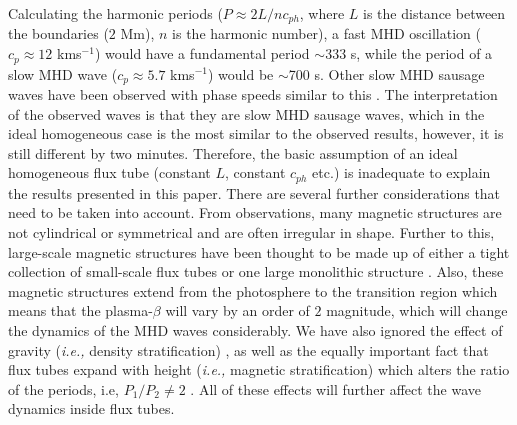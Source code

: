     Calculating the harmonic periods ($P \approx 2L/nc_{ph}$, where $L$ is the distance between the boundaries ($2$ Mm), $n$ is the harmonic number), a fast MHD oscillation ($c_{p}\approx12$ kms$^{-1}$) would have a fundamental period $\sim$333 s, while the period of a slow MHD wave ($c_{p}\approx5.7$ kms$^{-1}$) would be $\sim$700 s.
   	Other slow MHD sausage waves have been observed with phase speeds similar to this \citep{2015A&A...579A..73M}.
    The interpretation of the observed waves is that they are slow MHD sausage waves, which in the ideal homogeneous case is the most similar to the observed results, however, it is still different by two minutes.
    Therefore, the basic assumption of an ideal homogeneous flux tube (constant $L$, constant $c_{ph}$ etc.) is inadequate to explain the results presented in this paper.
    There are several further considerations that need to be taken into account.
    From observations, many magnetic structures are not cylindrical or symmetrical and are often irregular in shape.
    Further to this, large-scale magnetic structures have been thought to be made up of either a tight collection of small-scale flux tubes or one large monolithic structure \citep[][and references within]{priest1984solar}.
    Also, these magnetic structures extend from the photosphere to the transition region which means that the plasma-$\beta$ will vary by an order of $2$ magnitude, which will change the dynamics of the MHD waves considerably.
    We have also ignored the effect of gravity (\textit{i.e.,} density stratification) \citep{2006A&A...458..975D,2011ApJ...743..164A}, as well as the equally important fact that flux tubes expand with height (\textit{i.e.,} magnetic stratification) which alters the ratio of the periods, i.e, $P_{1}/P_{2}\neq2$ \citep{luna-cardozo}. 
    All of these effects will further affect the wave dynamics inside flux tubes.
    
